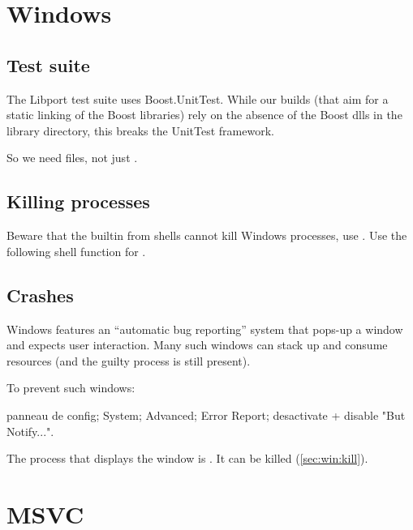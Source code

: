 \documentclass[openright,twoside,11pt]{book}
\begin{document}
\section{Windows}

\subsection{Test suite}

The Libport test suite uses Boost.UnitTest.  While our builds (that
aim for a static linking of the Boost libraries) rely on the absence
of the Boost dlls in the library directory, this breaks the UnitTest
framework.

So we need  files, not just
.

\subsection{Killing processes}
\label{sec:win:kill}
Beware that the  builtin from shells cannot kill Windows
processes, use .  Use the following shell function
for .


\subsection{Crashes}

Windows features an ``automatic bug reporting'' system that pops-up a
window and expects user interaction.  Many such windows can stack up
and consume resources (and the guilty process is still present).

To prevent such windows:

panneau de config; System; Advanced; Error Report; desactivate +
disable "But Notify...".

The process that displays the window is .  It can
be killed (\autoref{sec:win:kill}).

\section{MSVC}
\end{document}
